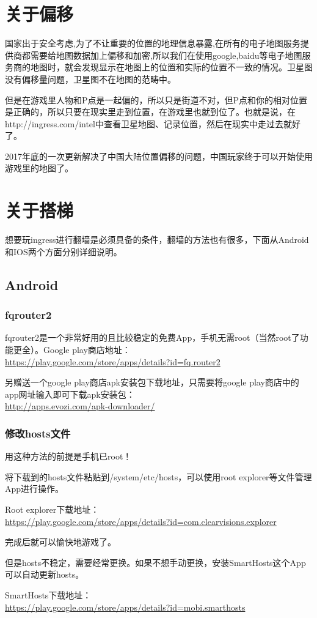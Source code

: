 \documentclass[12pt]{article}
\theoremstyle{definition}
\theoremstyle{remark}
\numberwithin{equation}{section}
\begin{document}
\section{关于偏移}
国家出于安全考虑,为了不让重要的位置的地理信息暴露,在所有的电子地图服务提供商都需要给地图数据加上偏移和加密,所以我们在使用google,baidu等电子地图服务商的地图时，就会发现显示在地图上的位置和实际的位置不一致的情况。卫星图没有偏移量问题，卫星图不在地图的范畴中。\par
但是在游戏里人物和P点是一起偏的，所以只是街道不对，但P点和你的相对位置是正确的，所以只要在现实里走到位置，在游戏里也就到位了。也就是说，在http://ingress.com/intel中查看卫星地图、记录位置，然后在现实中走过去就好了。\par
2017年底的一次更新解决了中国大陆位置偏移的问题，中国玩家终于可以开始使用游戏里的地图了。
\section{关于搭梯}
想要玩ingress进行翻墙是必须具备的条件，翻墙的方法也有很多，下面从Android和IOS两个方面分别详细说明。

\subsection{Android}
\subsubsection{fqrouter2}
fqrouter2是一个非常好用的且比较稳定的免费App，手机无需root（当然root了功能更全）。Google play商店地址：\\
\url{https://play.google.com/store/apps/details?id=fq.router2} \par
另赠送一个google play商店apk安装包下载地址，只需要将google play商店中的app网址输入即可下载apk安装包：\\
\url{http://apps.evozi.com/apk-downloader/}
\subsubsection{修改hosts文件}
用这种方法的前提是手机已root！\par
将下载到的hosts文件粘贴到/system/etc/hosts，可以使用root explorer等文件管理App进行操作。\par
Root explorer下载地址：\\
\url{https://play.google.com/store/apps/details?id=com.clearvisions.explorer}\par
完成后就可以愉快地游戏了。\par
但是hosts不稳定，需要经常更换。如果不想手动更换，安装SmartHosts这个App可以自动更新hosts。\par
SmartHosts下载地址：\\
\url{https://play.google.com/store/apps/details?id=mobi.smarthosts}
\end{document}
